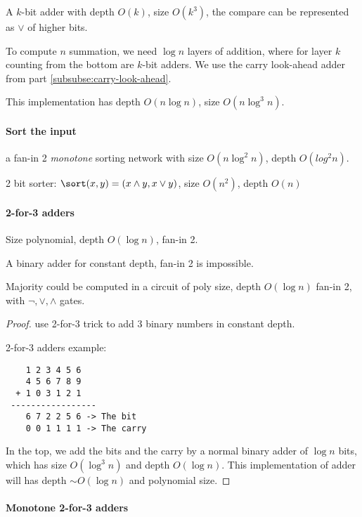 A $k$-bit adder with depth \by \(O(k)\), size \by \(O(k^3)\), the compare can be represented as $\lor$ of higher bits.

To compute $n$ summation, we need $\log n$ layers of addition, where for layer $k$ counting from the bottom are $k$-bit adders. We use the carry look-ahead adder from part \ref{subsubse:carry-look-ahead}.

This implementation has depth \by \(O(n \log n)\), size \by \(O(n\log ^3n)\).

\paragraph{Sort the input} a fan-in 2 \emph{monotone} sorting network with size \(O(n \log^2 n)\), depth \(O(log^2 n)\).

2 bit sorter: \(\sort(x,y) = (x \land y , x\lor y)\), size \(O(n^2)\), depth \(O(n)\)

\paragraph{2-for-3 adders} Size polynomial, depth \(O(\log n)\), fan-in
  2.

\begin{observation}
A binary adder for constant depth, fan-in 2 is impossible.
\end{observation} 

\begin{theorem}
Majority could be computed in a circuit of poly size,
depth \(O(\log n)\) fan-in 2, with \(\lnot, \lor, \land\) gates.
\end{theorem}

\begin{proof}
use 2-for-3 trick to add 3 binary numbers in constant depth.

2-for-3 adders example:

 \begin{verbatim}
    1 2 3 4 5 6
    4 5 6 7 8 9
  + 1 0 3 1 2 1
 -----------------
    6 7 2 2 5 6 -> The bit
    0 0 1 1 1 1 -> The carry
\end{verbatim}   

In the top, we add the bits and the carry by a normal binary adder of $\log n$ bits, which has size \by $O(\log^3 n)$ and depth \by $O(\log n)$. This implementation of adder will has depth $\sim O(\log n)$ and polynomial size.
\end{proof}

\paragraph{Monotone 2-for-3 adders}

